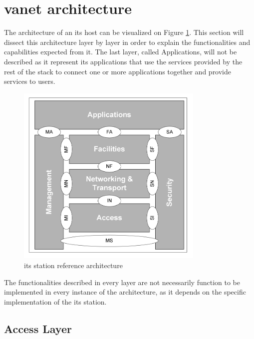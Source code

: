 \section[VANET architecture]{\gls{vanet} architecture}
\label{sec:vanet_arch}

The architecture of an \gls{its} host can be visualized on Figure \ref{fig:its_host}. This section will dissect this architecture layer by layer in order to explain the functionalities and capabilities expected from it. The last layer, called Applications, will not be described as it represent \gls{its} applications that use the services provided by the rest of the stack to connect one or more applications together and provide services to users\cite{etsi_intelligent_2010}.

\begin{figure}[htbp]
    \centering
   	\includegraphics[width=0.8\textwidth]{Chapters/Figures/VANETs/ITS-S_host_arch.png}
    \caption{\gls{its} station reference architecture~\cite{etsi_intelligent_2010}}
   	\label{fig:its_host}
\end{figure}

The functionalities described in every layer are not necessarily function to be implemented in every instance of the architecture, as it depends on the specific implementation of the \gls{its} station\cite{etsi_intelligent_2010}.

\subsection[Access Layer]{Access Layer}
\label{subsec:Access_Layer}

